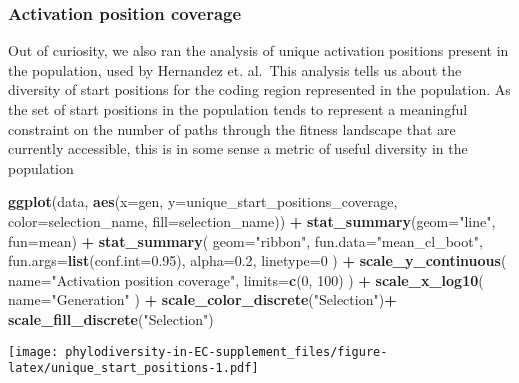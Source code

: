 \documentclass[]{book}
\newenvironment{Shaded}{\begin{snugshade}}{\end{snugshade}}
\newcommand{\DataTypeTok}[1]{\textcolor[rgb]{0.13,0.29,0.53}{#1}}
\newcommand{\DecValTok}[1]{\textcolor[rgb]{0.00,0.00,0.81}{#1}}
\newcommand{\FloatTok}[1]{\textcolor[rgb]{0.00,0.00,0.81}{#1}}
\newcommand{\KeywordTok}[1]{\textcolor[rgb]{0.13,0.29,0.53}{\textbf{#1}}}
\newcommand{\NormalTok}[1]{#1}
\newcommand{\OperatorTok}[1]{\textcolor[rgb]{0.81,0.36,0.00}{\textbf{#1}}}
\newcommand{\StringTok}[1]{\textcolor[rgb]{0.31,0.60,0.02}{#1}}
\begin{document}
\hypertarget{activation-position-coverage}{%
\subsubsection{Activation position coverage}\label{activation-position-coverage}}

Out of curiosity, we also ran the analysis of unique activation positions present in the population, used by Hernandez et. al.~This analysis tells us about the diversity of start positions for the coding region represented in the population. As the set of start positions in the population tends to represent a meaningful constraint on the number of paths through the fitness landscape that are currently accessible, this is in some sense a metric of useful diversity in the population

\begin{Shaded}
\begin{Highlighting}[]
\KeywordTok{ggplot}\NormalTok{(data, }\KeywordTok{aes}\NormalTok{(}\DataTypeTok{x=}\NormalTok{gen, }\DataTypeTok{y=}\NormalTok{unique_start_positions_coverage, }\DataTypeTok{color=}\NormalTok{selection_name, }\DataTypeTok{fill=}\NormalTok{selection_name)) }\OperatorTok{+}
\StringTok{  }\KeywordTok{stat_summary}\NormalTok{(}\DataTypeTok{geom=}\StringTok{"line"}\NormalTok{, }\DataTypeTok{fun=}\NormalTok{mean) }\OperatorTok{+}
\StringTok{  }\KeywordTok{stat_summary}\NormalTok{(}
    \DataTypeTok{geom=}\StringTok{"ribbon"}\NormalTok{,}
    \DataTypeTok{fun.data=}\StringTok{"mean_cl_boot"}\NormalTok{,}
    \DataTypeTok{fun.args=}\KeywordTok{list}\NormalTok{(}\DataTypeTok{conf.int=}\FloatTok{0.95}\NormalTok{),}
    \DataTypeTok{alpha=}\FloatTok{0.2}\NormalTok{,}
    \DataTypeTok{linetype=}\DecValTok{0}
\NormalTok{  ) }\OperatorTok{+}
\StringTok{  }\KeywordTok{scale_y_continuous}\NormalTok{(}
    \DataTypeTok{name=}\StringTok{"Activation position coverage"}\NormalTok{,}
    \DataTypeTok{limits=}\KeywordTok{c}\NormalTok{(}\DecValTok{0}\NormalTok{, }\DecValTok{100}\NormalTok{)}
\NormalTok{  ) }\OperatorTok{+}
\StringTok{  }\KeywordTok{scale_x_log10}\NormalTok{(}
    \DataTypeTok{name=}\StringTok{"Generation"}
\NormalTok{  ) }\OperatorTok{+}
\StringTok{  }\KeywordTok{scale_color_discrete}\NormalTok{(}\StringTok{"Selection"}\NormalTok{)}\OperatorTok{+}
\StringTok{  }\KeywordTok{scale_fill_discrete}\NormalTok{(}\StringTok{"Selection"}\NormalTok{)}
\end{Highlighting}
\end{Shaded}

\texttt{[image: phylodiversity-in-EC-supplement\_files/figure-latex/unique\_start\_positions-1.pdf]}
\end{document}

